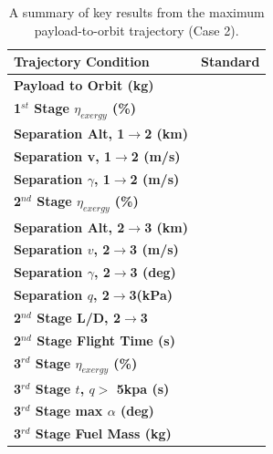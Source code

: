 \begin{table}[ht]
	\centering
	\begin{tabular}{l c } 
		\hline \textbf{Trajectory Condition}
		&Standard
	
		\\
		\hline \textbf{Payload to Orbit (kg)}
		& \textbf{\PayloadToOrbitStandardNoReturn}
		\\
		\hline \textbf{1$^{st}$ Stage $\eta_{exergy}$ (\%)}
		& \textbf{\firstExergyEffStandardNoReturn}
		\\
		\textbf{Separation Alt, 1$\rightarrow$2 (km)}
		& \firstsecondSeparationAltStandardNoReturn
		\\
		\textbf{Separation v, 1$\rightarrow$2 (m/s)}
		& \firstsecondSeparationvStandardNoReturn
		\\
		\textbf{Separation $\gamma$, 1$\rightarrow$2 (m/s)}
		& \firstsecondSeparationgammaStandardNoReturn
		\\
		\hline 
		\textbf{2$^{nd}$ Stage $\eta_{exergy}$ (\%)}
		& \textbf{\secondExergyEffStandardNoReturn}
		\\
		\textbf{Separation Alt, 2$\rightarrow$3 (km)}
		& \secondthirdSeparationAltStandardNoReturn
		\\
		\textbf{Separation $v$, 2$\rightarrow$3 (m/s)}
		& \secondthirdSeparationvStandardNoReturn
		\\
		\textbf{Separation $\gamma$, 2$\rightarrow$3 (deg)}
		& \secondthirdSeparationgammaStandardNoReturn
		\\
		\textbf{Separation $q$, 2$\rightarrow$3(kPa)}
		& \secondthirdSeparationqStandardNoReturn
		\\
		\textbf{2$^{nd}$ Stage L/D, 2$\rightarrow$3}
		& \secondthirdSeparationLDStandardNoReturn
		\\
		\textbf{2$^{nd}$ Stage Flight Time (s)}
		& \secondFlightTimeStandardNoReturn
		\\
		\hline 
		\textbf{3$^{rd}$ Stage $\eta_{exergy}$ (\%)}
		& \textbf{\thirddExergyEffStandardNoReturn}
		\\
		\textbf{3$^{rd}$ Stage $t$, $q >$ 5kpa (s)}
		& \thirdqOverFiveStandardNoReturn
		\\
		\textbf{3$^{rd}$ Stage max $\alpha$ (deg)}
		& \thirdmaxAoAStandardNoReturn
		\\
		\textbf{3$^{rd}$ Stage Fuel Mass (kg)}
		& \thirdmFuelStandardNoReturn
		\\
		\hline 
	\end{tabular} 
	\caption{A summary of key results from the maximum payload-to-orbit trajectory (Case 2).}
	\label{tab:summaryStandardNoReturn}
\end{table}







